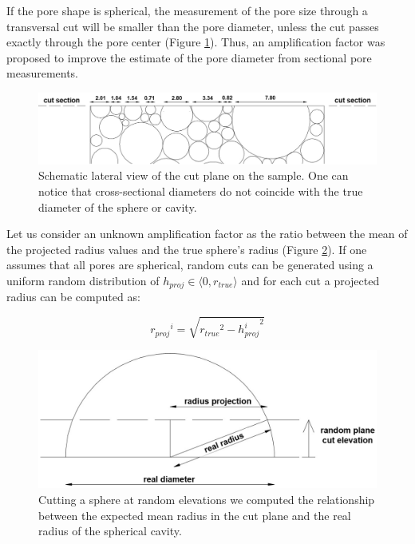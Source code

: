 \documentclass[review]{elsarticle}
\begin{document}
If the pore shape is spherical, the measurement of the pore size through a transversal cut will be smaller than the pore diameter, unless the cut passes exactly through the pore center (Figure \ref{FoamCutPlane}). Thus, an amplification factor was proposed to improve the estimate of the pore diameter from sectional pore measurements.

\begin{figure}[htbp]
	\begin{center}
		\includegraphics[width=0.95\linewidth]{Tex-Figures/Fig04.png}
		\caption{Schematic lateral view of the cut plane on the sample. One can notice that cross-sectional diameters do not coincide with the true diameter of the sphere or cavity.}
		\label{FoamCutPlane}
	\end{center}
\end{figure}


Let us consider an unknown amplification factor as the ratio between the mean of the projected radius values and the true sphere’s radius (Figure \ref{RandomPlaneCut}). If one assumes that all pores are spherical, random cuts can be generated using a uniform random distribution of $h_{proj} \in \langle 0,r_{true} \rangle$ and for each cut a projected radius can be computed as:

\begin{equation}\label{Eq11}
{r_{proj}}^i=\sqrt{{r_{true}}^2-{h_{proj}^i}^2}
\end{equation}


\begin{figure}[htbp]
	\begin{center}
		\includegraphics[width=0.75\linewidth]{Tex-Figures/Fig05.png}
		\caption{Cutting a sphere at random elevations we computed the relationship between the expected mean radius in the cut plane and the real radius of the spherical cavity.}
		\label{RandomPlaneCut}
	\end{center}
\end{figure}
\end{document}
